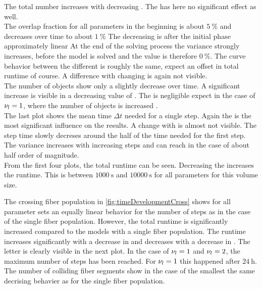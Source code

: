 The total number increases with decreasing \segLengthFactor{}.
The \segRadiusFactor{} has here no significant effect as well.
\\
% 
The overlap fraction for all parameters in the beginning is about $\SI{5}{\percent}$ and decreases over time to about $\SI{1}{\percent}$ 
The decreasing is after the initial phase approximately linear
At the end of the solving process the variance strongly increases, before the model is solved and the value is therefore $\SI{0}{\percent}$.
The curve behavior between the different \segLengthFactor{} is roughly the same, expect an offset in total runtime of course.
A difference with changing \segRadiusFactor{} is again not visible.
\\
% 
The number of objects show only a slightly decrease over time.
A significant increase is visible in a decreasing value of \segLengthFactor{}.
The \segRadiusFactor{} is negligible expect in the case of $\textnormal{$\nu_{l}$} = \SI{1}{}$, where the number of objects is increased .
\\
% 
The last plot shows the mean time $\Delta t$ needed for a single step.
Again the \segLengthFactor{} is the most significant influence on the results.
A change with \segRadiusFactor{} is almost not visible.
The step time slowly decreses around the half of the time needed for the first step.
The variance increases with increasing steps and can reach in the case of \segLengthFactor{} about half order of magnitude.
\\
% 
From the first four plots, the total runtime can be seen.
Decreasing the \segLengthFactor{} increases the runtime.
This is between $\SI{1000}{\second}$ and $\SI{10000}{\second}$ for all parameters for this volume size.
\par
% 
The crossing fiber population in \cref{fig:timeDevelopmentCross} shows for all parameter sets an equally linear behavior for the number of steps as in the case of the single fiber population.
However, the total runtime is significantly increased compared to the models with a single fiber population.
The runtime increases significantly with a decrease in \segLengthFactor{} and decreases with a decrease in \segRadiusFactor{}. 
The letter is clearly visible in the next plot.
In the case of $\textnormal{$\nu_{l}$} = \SI{1}{}$ and $\textnormal{$\nu_{l}$} = \SI{2}{}$, the maximum number of steps has been reached.
For $\textnormal{$\nu_{l}$} = \SI{1}{}$ this happened after $\SI{24}{\hour}$.
\\
% 
The number of colliding fiber segments show in the case of the smallest \segRadiusFactor{} the same decrising behavier as for the single fiber population.
